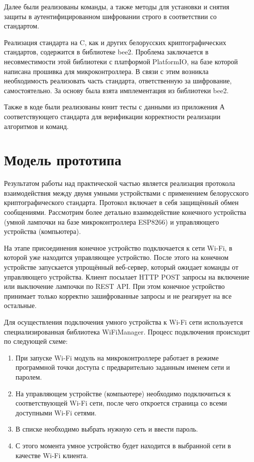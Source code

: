 	Далее были реализованы команды, а также методы для установки и снятия защиты в аутентифицированном 
	шифровании строго в соответствии со стандартом.
	
	Реализация стандарта на C, как и других белорусских криптографических стандартов, содержится 
	в библиотеке bee2. Проблема заключается в несовместимости этой библиотеки с платформой PlatformIO,
	на базе которой написана прошивка для микроконтроллера. В связи с этим возникла необходимость
	реализовать часть стандарта, ответственную за шифрование, самостоятельно. За основу была взята
	имплементация из библиотеки bee2.
	
	Также в коде были реализованы юнит тесты с данными из приложения А соответствующего стандарта для
	верификации корректности реализации алгоритмов и команд.

	
	\section{Модель прототипа}
	
	Результатом работы над практической частью является реализация протокола взаимодействия между
	двумя умными устройствами с применением белорусского криптографического стандарта. Протокол
	включает в себя защищённый обмен сообщениями. Рассмотрим более детально взаимодействие конечного
	устройства (умной лампочки на базе микроконтроллера ESP8266) и управляющего устройства (компьютера).
	
	На этапе присоединения конечное устройство подключается к сети Wi-Fi, в которой уже находится
	управляющее устройство. После этого на конечном устройстве запускается упрощённый веб-сервер,
	который ожидает команды от управляющего устройства. Клиент посылает HTTP POST запросы на
	включение или выключение лампочки по REST API. При этом конечное устройство принимает только 
	корректно зашифрованные запросы и не реагирует на все остальные.
	
	Для осуществления подключения умного устройства к Wi-Fi сети используется специализированная
	библиотека WiFiManager. Процесс подключения происходит по следующей схеме:
	
	\begin{enumerate}
		\item При запуске Wi-Fi модуль на микроконтроллере работает в режиме программной точки доступа
		с предварительно заданным именем сети и паролем.
		\item На управляющем устройстве (компьютере) необходимо подключиться к соответствующей Wi-Fi сети, 
		после чего откроется страница со всеми доступными Wi-Fi сетями.
		\item В списке необходимо выбрать нужную сеть и ввести пароль.
		\item С этого момента умное устройство будет находится в выбранной сети в качестве Wi-Fi клиента.
	\end{enumerate}

